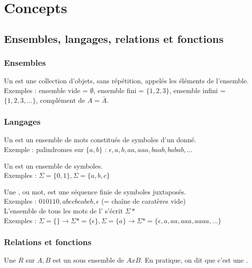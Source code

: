 \chapter{Concepts}

\section{Ensembles, langages, relations et fonctions}

\subsection{Ensembles}

Un  est une collection d'objets, sans répétition, appelés les éléments de l'ensemble.\\
Exemples : ensemble vide = $\emptyset$, ensemble fini = $\{1, 2, 3\}$, ensemble infini = $\{1, 2, 3, ...\}$, complément de $A = \bar{A}$.

\subsection{Langages}

Un  est un ensemble de mots constitués de symboles d'un  donné.\\
Exemple : palindromes sur $\{a, b\}$ : $\epsilon, a, b, aa, aaa, baab, babab, ...$

Un  est un ensemble de symboles.\\
Exemples : $\Sigma = \{0, 1\}, \Sigma = \{a, b, c\}$

Une , ou mot, est une séquence finie de symboles juxtaposés.\\
Exemples : $010110, abccbcabcb, \epsilon$ (= chaîne de caratères vide)\\
L'ensemble de tous les mots de l' s'écrit $\Sigma*$\\
Exemples : $\Sigma = \{\} \rightarrow \Sigma* = \{\epsilon\}, \Sigma = \{a\} \rightarrow \Sigma* = \{\epsilon, a, aa, aaa, aaaa, ...\}$

\subsection{Relations et fonctions}

Une  $R$ sur $A, B$ est un sous ensemble de $AxB$. En pratique, on dit que c'est une .

